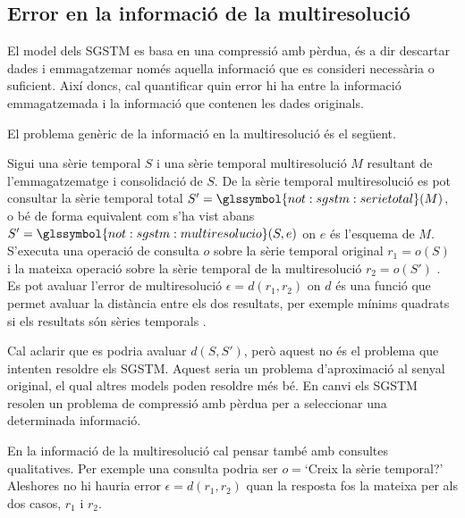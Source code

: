


\subsection{Error en la informació de la multiresolució}

El model dels \gls{SGSTM} es basa en una compressió amb pèrdua, és a
dir descartar dades i emmagatzemar només aquella informació que es
consideri necessària o suficient. Així doncs, cal quantificar quin
error hi ha entre la informació emmagatzemada i la informació que
contenen les dades originals.


El problema genèric de la informació en la multiresolució és el següent.
\begin{definition}
Sigui una sèrie temporal $S$ i una sèrie temporal multiresolució $M$
resultant de l'emmagatzematge i consolidació de $S$. De la sèrie
temporal multiresolució es pot consultar la sèrie temporal total
$S'=\glssymbol{not:sgstm:serietotal}(M)$, o bé de forma equivalent com
s'ha vist abans $S'=\glssymbol{not:sgstm:multiresolucio}(S,e)$ on $e$
és l'esquema de $M$.  S'executa una operació de consulta $o$ sobre la
sèrie temporal original $r_1=o(S)$ i la mateixa operació sobre la
sèrie temporal de la multiresolució $r_2=o(S')$ . Es pot avaluar l'error
de multiresolució $\epsilon=d(r_1,r_2)$ on $d$ és una funció que permet avaluar
la distància entre els dos resultats, per exemple mínims quadrats si
els resultats són sèries temporals .
\end{definition}


Cal aclarir que es podria avaluar $d(S,S')$, però aquest no és el
problema que intenten resoldre els \gls{SGSTM}. Aquest seria un
problema d'aproximació al senyal original, el qual altres models poden
resoldre més bé. En canvi els \gls{SGSTM} resolen un
problema de compressió amb pèrdua per a seleccionar una determinada
informació.




En la informació de la multiresolució cal pensar també amb consultes
qualitatives. Per exemple una consulta podria ser $o=$`Creix la sèrie
temporal?' Aleshores no hi hauria error $\epsilon=d(r_1,r_2)$ quan la
resposta fos la mateixa per als dos casos, $r_1$ i $r_2$.


